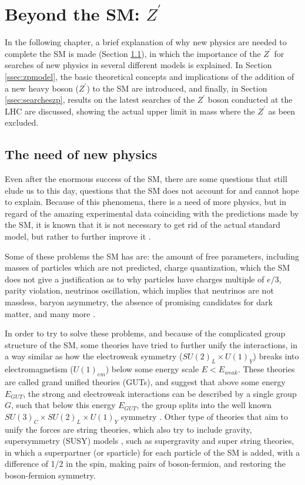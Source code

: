 \clearpage
\vspace{1cm}
\section{Beyond the SM: $Z^{\prime}$} \label{sec:Zprime}
\vspace{1cm}

In the following chapter, a brief explanation of why new physics are needed to complete the SM is made (Section \ref{ssec:newphysics}), in which the importance of the $Z^{\prime}$ for searches of new physics in several different models is explained. In Section \ref{ssec:zpmodel}, the basic theoretical concepts and implications of the addition of a new heavy boson ($Z^{\prime}$) to the SM are introduced, and finally, in Section \ref{ssec:searcheszp}, results on the latest searches of the $Z^{\prime}$ boson conducted at the LHC are discussed, showing the actual upper limit in mass where the $Z^{\prime}$ as been excluded.

\subsection{The need of new physics} \label{ssec:newphysics}

Even after the enormous success of the SM, there are some questions that still elude us to this day, questions that the SM does not account for and cannot hope to explain. Because of this phenomena, there is a need of more physics, but in regard of the amazing experimental data coinciding with the predictions made by the SM, it is known that it is not necessary to get rid of the actual standard model, but rather to further improve it \cite{Griffiths}. 

Some of these problems the SM has are: the amount of free parameters, including masses of particles which are not predicted, charge quantization, which the SM does not give a justification as to why particles have charges multiple of $e/3$, parity violation, neutrinos oscillation, which implies that neutrinos are not massless, baryon asymmetry, the absence of promising candidates for dark matter, and many more \cite{Goldberg}\cite{Langacker}.

In order to try to solve these problems, and because of the complicated group structure of the SM, some theories have tried to further unify the interactions, in a way similar as how the electroweak symmetry ($SU(2)_L\times U(1)_Y$) breaks into electromagnetism ($U(1)_{em}$) below some energy scale $E<E_{weak}$. These theories are called grand unified theories (GUTs), and suggest that above some energy $E_{GUT}$, the strong and electroweak interactions can be described by a single group $G$, such that below this energy $E_{GUT}$, the group splits into the well known $SU(3)_C\times SU(2)_L \times U(1)_Y$ symmetry \cite{Leike}. Other type of theories that aim to unify the forces are string theories, which also try to include gravity, supersymmetry (SUSY) models \cite{Langacker}\cite{Martin}, such as supergravity and super string theories, in which a superpartner (or sparticle) for each particle of the SM is added, with a difference of 1/2 in the spin, making pairs of boson-fermion, and restoring the boson-fermion symmetry.

